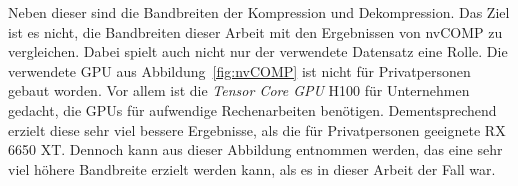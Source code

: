 Neben dieser sind die Bandbreiten der Kompression und Dekompression.
Das Ziel ist es nicht, die Bandbreiten dieser Arbeit mit den Ergebnissen von nvCOMP zu vergleichen.
Dabei spielt auch nicht nur der verwendete Datensatz eine Rolle.
Die verwendete GPU aus Abbildung~\ref{fig:nvCOMP} ist nicht für Privatpersonen gebaut worden.
Vor allem ist die \textit{Tensor Core GPU} H100 für Unternehmen gedacht, die GPUs für aufwendige Rechenarbeiten benötigen.
Dementsprechend erzielt diese sehr viel bessere Ergebnisse, als die für Privatpersonen geeignete RX 6650 XT.
Dennoch kann aus dieser Abbildung entnommen werden, das eine sehr viel höhere Bandbreite erzielt werden kann, als es in dieser Arbeit der Fall war.

